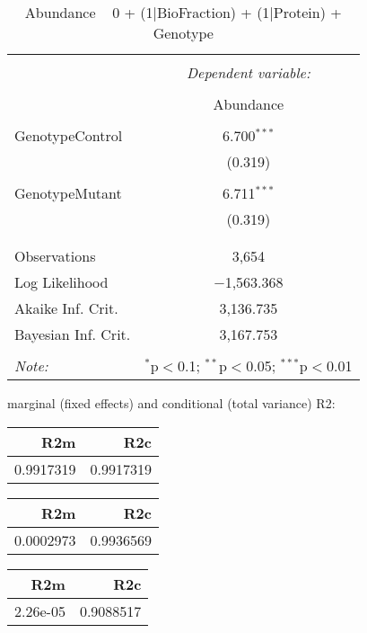 \documentclass[11pt]{report}
\begin{document}
\begin{table}[!htbp] \centering 
  \caption{Abundance ~ 0 + (1|BioFraction) + (1|Protein) + Genotype} 
  \label{} 
\begin{tabular}{@{\extracolsep{5pt}}lc} 
\\[-1.8ex]\hline 
\hline \\[-1.8ex] 
 & \multicolumn{1}{c}{\textit{Dependent variable:}} \\ 
\cline{2-2} 
\\[-1.8ex] & Abundance \\ 
\hline \\[-1.8ex] 
 GenotypeControl & 6.700$^{***}$ \\ 
  & (0.319) \\ 
  & \\ 
 GenotypeMutant & 6.711$^{***}$ \\ 
  & (0.319) \\ 
  & \\ 
\hline \\[-1.8ex] 
Observations & 3,654 \\ 
Log Likelihood & $-$1,563.368 \\ 
Akaike Inf. Crit. & 3,136.735 \\ 
Bayesian Inf. Crit. & 3,167.753 \\ 
\hline 
\hline \\[-1.8ex] 
\textit{Note:}  & \multicolumn{1}{r}{$^{*}$p$<$0.1; $^{**}$p$<$0.05; $^{***}$p$<$0.01} \\ 
\end{tabular} 
\end{table} 
marginal (fixed effects) and conditional (total variance) R2:

\begin{tabular}{r|r}
\hline
R2m & R2c\\
\hline
0.9917319 & 0.9917319\\
\hline
\end{tabular}

\begin{tabular}{r|r}
\hline
R2m & R2c\\
\hline
0.0002973 & 0.9936569\\
\hline
\end{tabular}

\begin{tabular}{r|r}
\hline
R2m & R2c\\
\hline
2.26e-05 & 0.9088517\\
\hline
\end{tabular}
\end{document}

